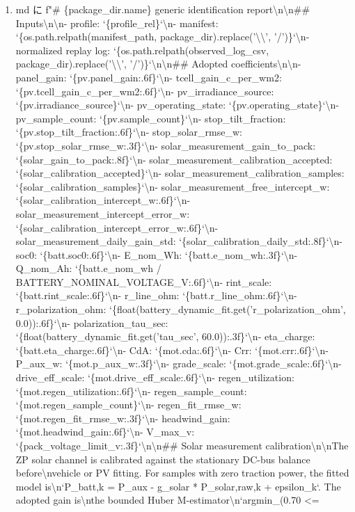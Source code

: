 \documentclass[a4paper,11pt]{article}
\begin{document}
\begin{enumerate}[leftmargin=1.8em]
\item md に f"\# \{package\_dir.name\} generic identification report\textbackslash{}n\textbackslash{}n\#\# Inputs\textbackslash{}n\textbackslash{}n- profile: `\{profile\_rel\}`\textbackslash{}n- manifest: `\{os.path.relpath(manifest\_path, package\_dir).replace('\textbackslash{}\textbackslash{}', '/')\}`\textbackslash{}n- normalized replay log: `\{os.path.relpath(observed\_log\_csv, package\_dir).replace('\textbackslash{}\textbackslash{}', '/')\}`\textbackslash{}n\textbackslash{}n\#\# Adopted coefficients\textbackslash{}n\textbackslash{}n- panel\_gain: `\{pv.panel\_gain:.6f\}`\textbackslash{}n- tcell\_gain\_c\_per\_wm2: `\{pv.tcell\_gain\_c\_per\_wm2:.6f\}`\textbackslash{}n- pv\_irradiance\_source: `\{pv.irradiance\_source\}`\textbackslash{}n- pv\_operating\_state: `\{pv.operating\_state\}`\textbackslash{}n- pv\_sample\_count: `\{pv.sample\_count\}`\textbackslash{}n- stop\_tilt\_fraction: `\{pv.stop\_tilt\_fraction:.6f\}`\textbackslash{}n- stop\_solar\_rmse\_w: `\{pv.stop\_solar\_rmse\_w:.3f\}`\textbackslash{}n- solar\_measurement\_gain\_to\_pack: `\{solar\_gain\_to\_pack:.8f\}`\textbackslash{}n- solar\_measurement\_calibration\_accepted: `\{solar\_calibration\_accepted\}`\textbackslash{}n- solar\_measurement\_calibration\_samples: `\{solar\_calibration\_samples\}`\textbackslash{}n- solar\_measurement\_free\_intercept\_w: `\{solar\_calibration\_intercept\_w:.6f\}`\textbackslash{}n- solar\_measurement\_intercept\_error\_w: `\{solar\_calibration\_intercept\_error\_w:.6f\}`\textbackslash{}n- solar\_measurement\_daily\_gain\_std: `\{solar\_calibration\_daily\_std:.8f\}`\textbackslash{}n- soc0: `\{batt.soc0:.6f\}`\textbackslash{}n- E\_nom\_Wh: `\{batt.e\_nom\_wh:.3f\}`\textbackslash{}n- Q\_nom\_Ah: `\{batt.e\_nom\_wh / BATTERY\_NOMINAL\_VOLTAGE\_V:.6f\}`\textbackslash{}n- rint\_scale: `\{batt.rint\_scale:.6f\}`\textbackslash{}n- r\_line\_ohm: `\{batt.r\_line\_ohm:.6f\}`\textbackslash{}n- r\_polarization\_ohm: `\{float(battery\_dynamic\_fit.get('r\_polarization\_ohm', 0.0)):.6f\}`\textbackslash{}n- polarization\_tau\_sec: `\{float(battery\_dynamic\_fit.get('tau\_sec', 60.0)):.3f\}`\textbackslash{}n- eta\_charge: `\{batt.eta\_charge:.6f\}`\textbackslash{}n- CdA: `\{mot.cda:.6f\}`\textbackslash{}n- Crr: `\{mot.crr:.6f\}`\textbackslash{}n- P\_aux\_w: `\{mot.p\_aux\_w:.3f\}`\textbackslash{}n- grade\_scale: `\{mot.grade\_scale:.6f\}`\textbackslash{}n- drive\_eff\_scale: `\{mot.drive\_eff\_scale:.6f\}`\textbackslash{}n- regen\_utilization: `\{mot.regen\_utilization:.6f\}`\textbackslash{}n- regen\_sample\_count: `\{mot.regen\_sample\_count\}`\textbackslash{}n- regen\_fit\_rmse\_w: `\{mot.regen\_fit\_rmse\_w:.3f\}`\textbackslash{}n- headwind\_gain: `\{mot.headwind\_gain:.6f\}`\textbackslash{}n- V\_max\_v: `\{pack\_voltage\_limit\_v:.3f\}`\textbackslash{}n\textbackslash{}n\#\# Solar measurement calibration\textbackslash{}n\textbackslash{}nThe ZP solar channel is calibrated against the stationary DC-bus balance before\textbackslash{}nvehicle or PV fitting. For samples with zero traction power, the fitted model is\textbackslash{}n`P\_batt,k = P\_aux - g\_solar * P\_solar,raw,k + epsilon\_k`. The adopted gain is\textbackslash{}nthe bounded Huber M-estimator\textbackslash{}n`argmin\_(0.70 <= 
\end{enumerate}
\end{document}
